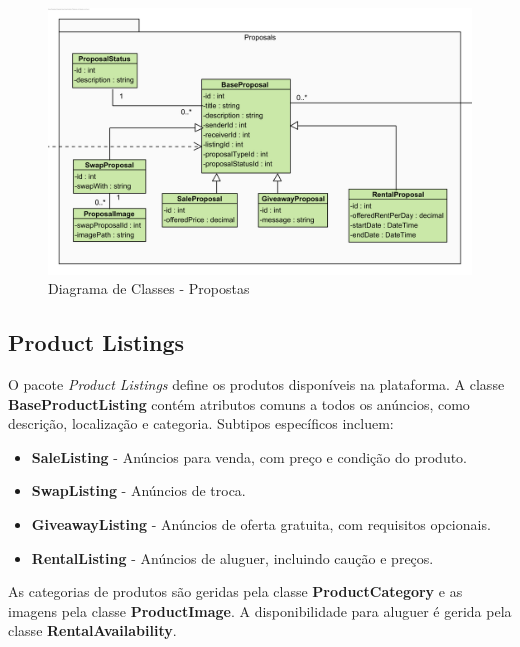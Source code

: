 \documentclass[a4paper, 12pt]{article} %
\begin{document}
\begin{figure}[ht]
	\centering
	\includegraphics[width=\textwidth]{../images/class-diagram-proposals.png}
	\caption{Diagrama de Classes - Propostas}
	\label{fig:class_diagram_proposals}
\end{figure}

\newpage

\subsection{Product Listings}
O pacote \textit{Product Listings} define os produtos disponíveis na plataforma. A classe \textbf{BaseProductListing} contém atributos comuns a todos os anúncios, como descrição, localização e categoria. Subtipos específicos incluem:
\begin{itemize}
	\item \textbf{SaleListing} - Anúncios para venda, com preço e condição do produto.
	\item \textbf{SwapListing} - Anúncios de troca.
	\item \textbf{GiveawayListing} - Anúncios de oferta gratuita, com requisitos opcionais.
	\item \textbf{RentalListing} - Anúncios de aluguer, incluindo caução e preços.
\end{itemize}
As categorias de produtos são geridas pela classe \textbf{ProductCategory} e as imagens pela classe \textbf{ProductImage}. A disponibilidade para aluguer é gerida pela classe \textbf{RentalAvailability}.
\end{document}
